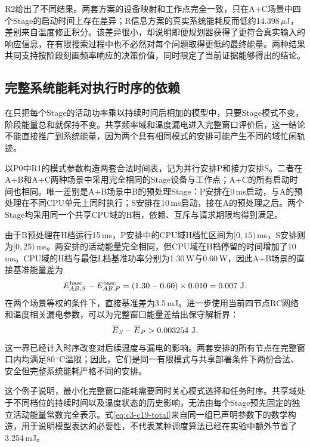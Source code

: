 R2给出了不同结果。两套方案的设备映射和工作点完全一致，只在A+C场景中四个Stage的启动时间上存在差异；R信息方案的真实系统能耗反而低约14.398\,$\mu$J，差别来自温度修正积分。该差异很小，却说明即便规划器获得了更符合真实输入的响应信息，在有限搜索过程中也不必然对每个问题取得更低的最终能量。两种结果共同支持按阶段刻画频率响应的决策价值，同时限定了当前证据能够得出的结论。


\subsection{完整系统能耗对执行时序的依赖}

在只把每个Stage的活动功率乘以持续时间后相加的模型中，只要Stage模式不变，阶段能量总和就保持不变。共享频率域和温度漏电进入完整窗口评价后，这一结论不能直接推广到系统能量，因为两个具有相同模式的安排可能产生不同的域忙闲轨迹。

以P0中R1的模式参数构造两套合法时间表，记为并行安排P和接力安排S。二者在A+B和A+C两种场景中采用完全相同的Stage设备与工作点；A+C的所有启动时间也相同。唯一差别是A+B场景中B的预处理Stage：P安排在0\,ms启动，与A的预处理在不同CPU单元上同时执行；S安排在10\,ms启动，接在A的预处理之后。两个Stage均采用同一个共享CPU域的H档，依赖、互斥与请求期限均得到满足。

由于B预处理在H档运行15\,ms，P安排中的CPU域H档忙区间为$[0,15)$\,ms，S安排则为$[0,25)$\,ms。两安排的活动能量完全相同，但CPU域在H档停留的时间增加了10\,ms。CPU域的H档与最低L档基准功率分别为1.30\,W与0.60\,W，因此A+B场景的直接基准能量差为
\begin{equation}
 E^{\rm base}_{AB,S}-E^{\rm base}_{AB,P}
  =(1.30-0.60)\times0.010
  =0.007\ {\rm J}.
 \label{eq:c3-c19-base}
\end{equation}
在两个场景等权的条件下，直接基准差为3.5\,mJ。进一步使用当前四节点RC网络和温度相关漏电参数，可以为完整窗口能量差给出保守解析界：
\begin{equation}
 \overline E_S-\overline E_P>0.003254\ {\rm J}.
 \label{eq:c3-c19-total}
\end{equation}
这一界已经计入时序改变对后续温度与漏电的影响。两套安排的所有节点在完整窗口内均满足80\,$^\circ$C温限；因此，它们是同一有限模式与共享部署条件下两份合法、安全但完整系统能耗严格不同的安排。

这个例子说明，最小化完整窗口能耗需要同时关心模式选择和任务时序。共享域处于不同档位的持续时间以及温度状态的历史影响，无法由每个Stage预先固定的独立活动能量常数完全表示。式\eqref{eq:c3-c19-total}来自同一组已声明参数下的数学构造，用于说明模型表达的必要性，不代表某种调度算法已经在实验中额外节省了3.254\,mJ。

